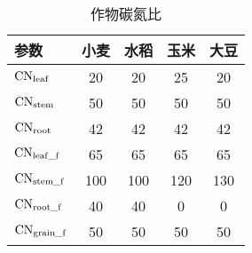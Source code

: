 \begin{table}[htbp]
  \centering
  \caption{作物碳氮比}
  \label{tab:作物碳氮比}
  \begin{tabular}{@{}lcccc@{}}
    \toprule
    参数                     & 小麦 & 水稻 & 玉米 & 大豆 \\ \midrule
    ${\rm CN}_{\mathrm{leaf}}$     & 20   & 20   & 25   & 20   \\
    ${\rm CN}_{\mathrm{stem}}$     & 50   & 50   & 50   & 50   \\
    ${\rm CN}_{\mathrm{root}}$     & 42   & 42   & 42   & 42   \\
    ${\rm CN}_{\mathrm{leaf\_f}}$  & 65   & 65   & 65   & 65   \\
    ${\rm CN}_{\mathrm{stem\_f}}$  & 100  & 100  & 120  & 130  \\
    ${\rm CN}_{\mathrm{root\_f}}$  & 40   & 40   & 0    & 0    \\
    ${\rm CN}_{\mathrm{grain\_f}}$ & 50   & 50   & 50   & 50   \\ \bottomrule
  \end{tabular}
\end{table}

%

%


